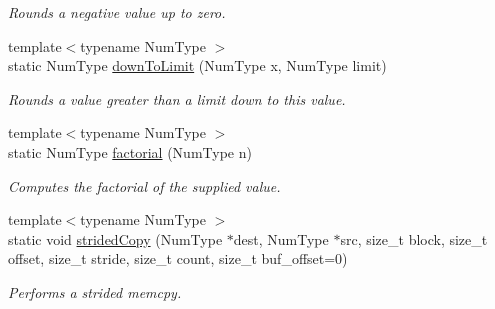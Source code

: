 \begin{DoxyCompactItemize}
\begin{DoxyCompactList}\small\item\em Rounds a negative value up to zero. \end{DoxyCompactList}\item 
{\footnotesize template$<$typename Num\+Type $>$ }\\static Num\+Type \hyperlink{class_grid_utils_abd4068e22339d5272ca551f8cbddec26}{down\+To\+Limit} (Num\+Type x, Num\+Type limit)
\begin{DoxyCompactList}\small\item\em Rounds a value greater than a limit down to this value. \end{DoxyCompactList}\item 
{\footnotesize template$<$typename Num\+Type $>$ }\\static Num\+Type \hyperlink{class_grid_utils_a57edeaeba2d67d187a9edd0b560fe0c2}{factorial} (Num\+Type n)
\begin{DoxyCompactList}\small\item\em Computes the factorial of the supplied value. \end{DoxyCompactList}\item 
{\footnotesize template$<$typename Num\+Type $>$ }\\static void \hyperlink{class_grid_utils_aa3ca6e20ef4fa927cb845956d7565b1e}{strided\+Copy} (Num\+Type $\ast$dest, Num\+Type $\ast$src, size\+\_\+t block, size\+\_\+t offset, size\+\_\+t stride, size\+\_\+t count, size\+\_\+t buf\+\_\+offset=0)
\begin{DoxyCompactList}\small\item\em Performs a strided memcpy. \end{DoxyCompactList}\end{DoxyCompactItemize}
